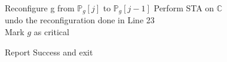 \begin{algorithm}[!t]
{{{

 {
Reconfigure g from $\mathbb P_{g}[j]$ to $\mathbb P_{g}[j-1]$ }
Perform STA on $\mathbb C$ \\
{undo the reconfiguration done in Line 23\\
Mark $g$ as critical\\
\Continue
}
}

}
}
Report Success and exit\\
%
%
%
%

 \end{algorithm}


